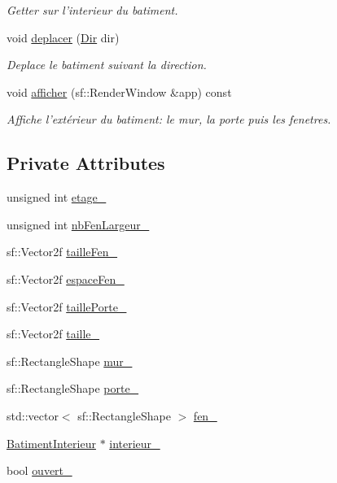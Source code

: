 \begin{DoxyCompactItemize}
\begin{DoxyCompactList}\small\item\em Getter sur l'interieur du batiment. \end{DoxyCompactList}\item 
void \hyperlink{classBatimentExterieur_a1f58c795cc083e7765ffabc396636d3e}{deplacer} (\hyperlink{Espace_8h_a7cf6e8c5a5bc5e7b2afef3647870b1c4}{Dir} dir)
\begin{DoxyCompactList}\small\item\em Deplace le batiment suivant la direction. \end{DoxyCompactList}\item 
void \hyperlink{classBatimentExterieur_aa526f2d266e481cb12b2cd9d94eaeed4}{afficher} (sf\-::\-Render\-Window \&app) const 
\begin{DoxyCompactList}\small\item\em Affiche l'extérieur du batiment\-: le mur, la porte puis les fenetres. \end{DoxyCompactList}\end{DoxyCompactItemize}
\subsection*{Private Attributes}
\begin{DoxyCompactItemize}
\item 
unsigned int \hyperlink{classBatimentExterieur_af4fc6e80ed2a6eb26264697d9cd752a4}{etage\-\_\-}
\item 
unsigned int \hyperlink{classBatimentExterieur_a67bacf13a8f3a238d89d8685a750ff40}{nb\-Fen\-Largeur\-\_\-}
\item 
sf\-::\-Vector2f \hyperlink{classBatimentExterieur_a9f70a87570723674f6e1f383942248ef}{taille\-Fen\-\_\-}
\item 
sf\-::\-Vector2f \hyperlink{classBatimentExterieur_ada8bdedf97824310bc6464ab99f2841a}{espace\-Fen\-\_\-}
\item 
sf\-::\-Vector2f \hyperlink{classBatimentExterieur_afb8fac448d76a2c934a16ec0981f9004}{taille\-Porte\-\_\-}
\item 
sf\-::\-Vector2f \hyperlink{classBatimentExterieur_aba1fa0abfce890e24e93619a4a52ab62}{taille\-\_\-}
\item 
sf\-::\-Rectangle\-Shape \hyperlink{classBatimentExterieur_a6929037a2c2ab1893c4992452454e7f6}{mur\-\_\-}
\item 
sf\-::\-Rectangle\-Shape \hyperlink{classBatimentExterieur_a175feefa144902956539361a17be4b4b}{porte\-\_\-}
\item 
std\-::vector$<$ sf\-::\-Rectangle\-Shape $>$ \hyperlink{classBatimentExterieur_a8987b811e7ed4e6d535af016d8313a39}{fen\-\_\-}
\item 
\hyperlink{classBatimentInterieur}{Batiment\-Interieur} $\ast$ \hyperlink{classBatimentExterieur_a777ffd957176d89835f51c94ee5f7c3f}{interieur\-\_\-}
\item 
bool \hyperlink{classBatimentExterieur_a10dcc22bae2b39269bbcb0318430305c}{ouvert\-\_\-}
\end{DoxyCompactItemize}


